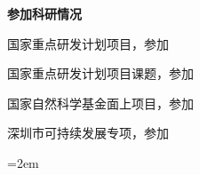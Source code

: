 \vspace*{1em}

%
%	


\textbf{参加科研情况}
\begin{publist}
	\item 国家重点研发计划项目，参加
	\item 国家重点研发计划项目课题，参加
	\item 国家自然科学基金面上项目，参加
	\item 深圳市可持续发展专项，参加
	
\end{publist}
\vfill
{}\hangindent=2em\noindent

\setlength{\parindent}{2em}

